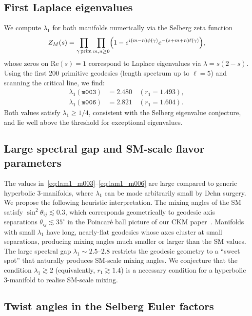 ﻿\documentclass[aps,prd,twocolumn,longbibliography]{revtex4-2}
\newcommand{\mfld}[1]{\texttt{#1}}
\newcommand{\degr}{^{\circ}}
\begin{document}
\subsection{First Laplace eigenvalues}

We compute $\lambda_1$ for both manifolds numerically via the Selberg zeta
function~\cite{Selberg56}
\begin{equation}
  Z_M(s) = \prod_{\gamma\,\rm prim}\prod_{m,n\geq 0}
  \Bigl(1-e^{i(m-n)\phi(\gamma)}e^{-(s+m+n)\ell(\gamma)}\Bigr),
  \label{eq:selberg}
\end{equation}
whose zeros on $\mathrm{Re}(s)=1$ correspond to Laplace eigenvalues via
$\lambda = s(2-s)$.
Using the first 200 primitive geodesics (length spectrum up to $\ell=5$) and
scanning the critical line, we find:
\begin{align}
  \lambda_1(\mfld{m003}) &= 2.480 \quad (r_1=1.493), \label{eq:lam1_m003}\\
  \lambda_1(\mfld{m006}) &= 2.821 \quad (r_1=1.604). \label{eq:lam1_m006}
\end{align}
Both values satisfy $\lambda_1 \geq 1/4$, consistent with the Selberg eigenvalue
conjecture, and lie well above the threshold for exceptional eigenvalues.

\subsection{Large spectral gap and SM-scale flavor parameters}

The values in~\eqref{eq:lam1_m003}--\eqref{eq:lam1_m006} are large compared
to generic hyperbolic 3-manifolds, where $\lambda_1$ can be made arbitrarily
small by Dehn surgery.
We propose the following heuristic interpretation.
The mixing angles of the SM satisfy
$\sin^2\theta_{ij}\lesssim 0.3$, which corresponds geometrically to
geodesic axis separations $\theta_{ij}\lesssim 35\degr$ in the Poincar\'e
ball picture of our CKM paper~\cite{GentryCKM}.
Manifolds with small $\lambda_1$ have long, nearly-flat geodesics whose
axes cluster at small separations, producing mixing angles much smaller or
larger than the SM values.
The large spectral gap $\lambda_1\sim 2.5$--$2.8$ restricts the geodesic
geometry to a ``sweet spot'' that naturally produces SM-scale mixing angles.
We conjecture that the condition $\lambda_1\gtrsim 2$ (equivalently,
$r_1\gtrsim 1.4$) is a necessary condition for a hyperbolic 3-manifold to
realise SM-scale mixing.

\subsection{Twist angles in the Selberg Euler factors}
\end{document}
